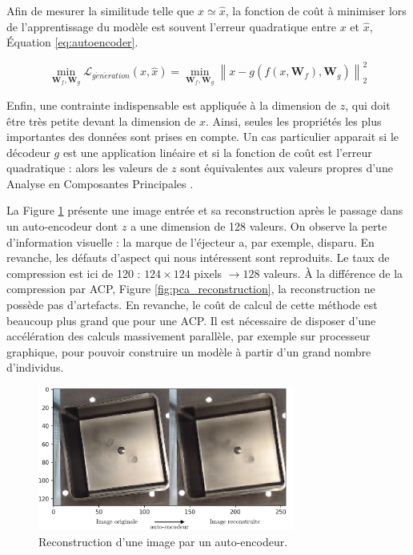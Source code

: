 Afin de mesurer la similitude telle que $x \simeq \hat x$, la fonction de coût à minimiser lors de l'apprentissage du modèle est souvent l'erreur quadratique entre $x$ et $\hat x$, Équation \ref{eq:autoencoder}.

\begin{equation} \label{eq:autoencoder}
\min _{\mathbf{W}_{f}, \mathbf{W}_{g}} \mathcal{L}_{g\acute{e}n\acute{e}ration}\left(x, \hat{x}\right) = \min _{\mathbf{W}_{f}, \mathbf{W}_{g}} \left\|x-g\left(f\left(x, \mathbf{W}_{f}\right), \mathbf{W}_{g}\right)\right\|_{2}^{2}
\end{equation}

Enfin, une contrainte indispensable est appliquée à la dimension de $z$, qui doit être très petite devant la dimension de $x$.
Ainsi, seules les propriétés les plus importantes des données sont prises en compte.
Un cas particulier apparait si le décodeur $g$ est une application linéaire et si la fonction de coût est l'erreur quadratique : alors les valeurs de $z$ sont équivalentes aux valeurs propres d'une Analyse en Composantes Principales \cite{bourlard_autoassociation_1988}.

La Figure \ref{fig:autoencoder} présente une image entrée et sa reconstruction après le passage dans un auto-encodeur dont $z$ a une dimension de 128 valeurs.
On observe la perte d'information visuelle : la marque de l'éjecteur a, par exemple, disparu.
En revanche, les défauts d'aspect qui nous intéressent sont reproduits.
Le taux de compression est ici de 120 : $124 \times 124$ pixels $\rightarrow 128$ valeurs.
À la différence de la compression par ACP, Figure \ref{fig:pca_reconstruction}, la reconstruction ne possède pas d'artefacts.
En revanche, le coût de calcul de cette méthode est beaucoup plus grand que pour une ACP.
Il est nécessaire de disposer d'une accélération des calculs massivement parallèle, par exemple sur processeur graphique, pour pouvoir construire un modèle à partir d'un grand nombre d'individus.

\begin{figure}[hbtp]
	\centering
	\includegraphics[width=0.75\textwidth,height=\textheight,keepaspectratio]{../Chap4/Figures/visualize_reconstructed_variations.png}
	\caption{Reconstruction d'une image par un auto-encodeur.}
	\label{fig:autoencoder}
\end{figure}

